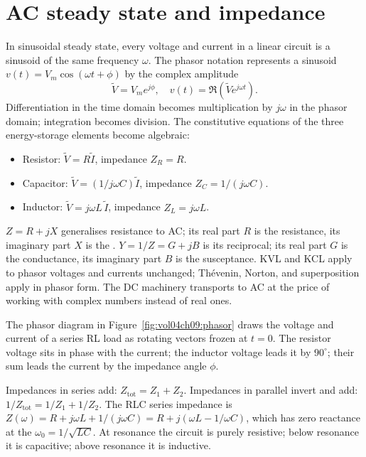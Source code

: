 \section{AC steady state and impedance}
\label{sec:vol04ch09:ac}

In sinusoidal steady state, every voltage and current in a linear
circuit is a sinusoid of the same frequency $\omega$. The phasor
notation represents a sinusoid $v(t) = V_{m}\cos(\omega t+\phi)$ by
the complex amplitude
\[
\tilde V = V_{m}e^{j\phi}, \quad v(t) = \Re(\tilde V e^{j\omega t}).
\]
Differentiation in the time domain becomes multiplication by $j\omega$
in the phasor domain; integration becomes division. The constitutive
equations of the three energy-storage elements become algebraic:
\begin{itemize}[leftmargin=*]
  \item Resistor: $\tilde V = R\tilde I$, impedance $Z_{R} = R$.
  \item Capacitor: $\tilde V = (1/j\omega C)\tilde I$, impedance
    $Z_{C} = 1/(j\omega C)$.
  \item Inductor: $\tilde V = j\omega L\,\tilde I$, impedance
    $Z_{L} = j\omega L$.
\end{itemize}
 $Z = R+jX$ generalises resistance to AC; its real
part $R$ is the resistance, its imaginary part $X$ is the
.  $Y = 1/Z = G+jB$ is its
reciprocal; its real part $G$ is the conductance, its imaginary part
$B$ is the susceptance. KVL and KCL apply to phasor voltages and
currents unchanged; Th\'evenin, Norton, and superposition apply in
phasor form. The DC machinery transports to AC at the price of
working with complex numbers instead of real ones.



The phasor diagram in Figure~\ref{fig:vol04ch09:phasor} draws the
voltage and current of a series RL load as rotating vectors frozen at
$t=0$. The resistor voltage sits in phase with the current; the
inductor voltage leads it by $90^\circ$; their sum leads the current by
the impedance angle $\phi$.

Impedances in series add: $Z_{\text{tot}} = Z_{1}+Z_{2}$. Impedances in
parallel invert and add: $1/Z_{\text{tot}} = 1/Z_{1}+1/Z_{2}$. The RLC
series impedance is $Z(\omega) = R + j\omega L + 1/(j\omega C) = R +
j(\omega L - 1/\omega C)$, which has zero reactance at the
 $\omega_{0} = 1/\sqrt{LC}$. At resonance
the circuit is purely resistive; below resonance it is capacitive;
above resonance it is inductive.

